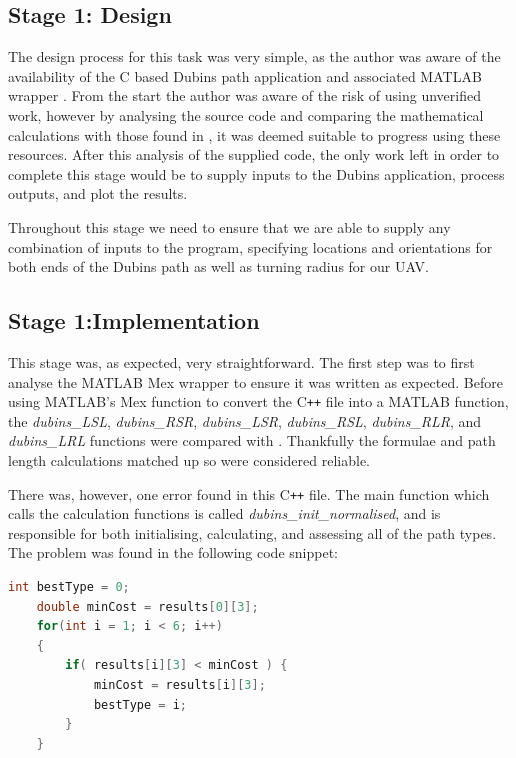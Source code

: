 \subsection{Stage 1: Design}
\label{task1:stage1:design}


The design process for this task was very simple, as the author was aware of the availability of the C based Dubins path application and associated MATLAB wrapper \cite{WalkerDubinsCurves,MexDubinsCurves}. From the start the author was aware of the risk of using unverified work, however by analysing the source code and comparing the mathematical calculations with those found in \cite{shkel2001classification}, it was deemed suitable to progress using these resources. After this analysis of the supplied code, the only work left in order to complete this stage would be to supply inputs to the Dubins application, process outputs, and plot the results.

Throughout this stage we need to ensure that we are able to supply any combination of inputs to the program, specifying locations and orientations for both ends of the Dubins path as well as turning radius for our UAV.

\subsection{Stage 1:Implementation}
\label{task1:stage1:implementation}


This stage was, as expected, very straightforward. The first step was to first analyse the MATLAB Mex wrapper to ensure it was written as expected. Before using MATLAB's Mex function to convert the C\texttt{++} file into a MATLAB function, the \textit{dubins\_LSL}, \textit{dubins\_RSR}, \textit{dubins\_LSR}, \textit{dubins\_RSL}, \textit{dubins\_RLR}, and \textit{dubins\_LRL} functions were compared with \cite{shkel2001classification}. Thankfully the formulae and path length calculations matched up so were considered reliable. 

There was, however, one error found in this C\texttt{++} file. The main function which calls the calculation functions is called \textit{dubins\_init\_normalised}, and is responsible for both initialising, calculating, and assessing all of the path types. The problem was found in the following code snippet: 

\begin{minipage}{\linewidth}
\begin{lstlisting}[language=C++]
    int bestType = 0;
    double minCost = results[0][3];
    for(int i = 1; i < 6; i++) 
    {
        if( results[i][3] < minCost ) {
            minCost = results[i][3];
            bestType = i;
        } 
    }
\end{lstlisting}
\end{minipage}

